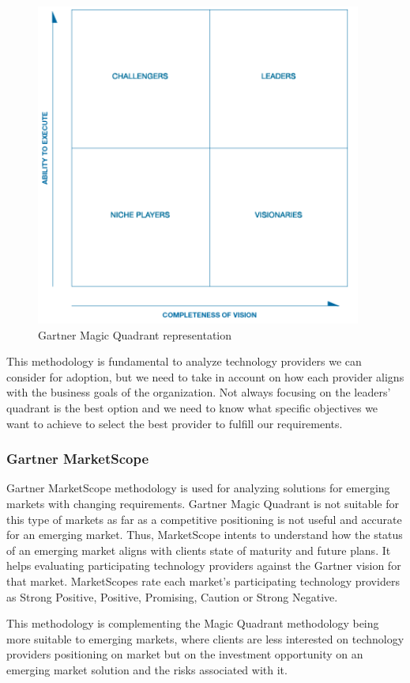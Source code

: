\begin{figure}
\centering
\includegraphics{img/GartnerMagicQuadrant.png}
\caption{Gartner Magic Quadrant representation}
\end{figure}

This methodology is fundamental to analyze technology providers we can consider for adoption, but we need to take in account on how each provider aligns with the business goals of the organization. Not always focusing on the leaders' quadrant is the best option and we need to know what specific objectives we want to achieve to select the best provider to fulfill our requirements. 


\subsubsection{Gartner MarketScope}

Gartner MarketScope methodology is used for analyzing solutions for emerging markets with changing requirements. Gartner Magic Quadrant is not suitable for this type of markets as far as a competitive positioning is not useful and accurate for an emerging market. Thus, MarketScope intents to understand how the status of an emerging market aligns with clients state of maturity and future plans. It helps evaluating participating technology providers against the Gartner vision for that market. MarketScopes rate each market’s participating technology providers as Strong Positive, Positive, Promising, Caution or Strong Negative.\par
This methodology is complementing the Magic Quadrant methodology being more suitable to emerging markets, where clients are less interested on technology providers positioning on market but on the investment opportunity on an emerging market solution and the risks associated with it.\par 

